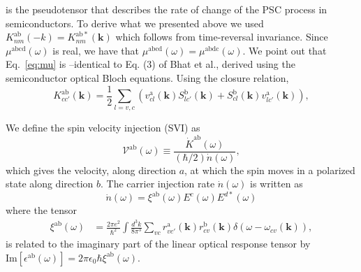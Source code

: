 \documentclass[floatfix,prb,aps,superscriptaddress,showpacs,11pt,preprint,letterpaper]{revtex4}
\begin{document}
is the pseudotensor that describes the rate of change of the  PSC process in
semiconductors. To derive what we presented above we used $
K^{\mathrm{ab}}_{nm}({\mathbf -k}) = K^{\mathrm{ab*}}_{nm}({\mathbf k})$ which
follows from time-reversal invariance. Since $\mu^{\mathrm{abcd}}(\omega)$ is
real, we have that $\mu^{\mathrm{abcd}}(\omega) =
\mu^{\mathrm{abdc}} (\omega)$. We point out that Eq.~\eqref{eq:mu} is
–identical to Eq. (3) of Bhat et al.\cite{bhatPRL05}, derived using the
semiconductor optical Bloch equations. Using the closure relation,
\begin{equation}
K^{\mathrm{ab}}_{cc'}({\mathbf k}) = \frac{1}{2}
\sum_{l=v,c}
\left(v^{\mathrm{a}}_{cl}({\mathbf k})S^{\mathrm{b}}_{lc'}({\mathbf k})
+S^{\mathrm{b}}_{cl}({\mathbf k}) v^{\mathrm{a}}_{lc'}({\mathbf k})
\right)
,
\label{eq:velspimatelem}
\end{equation}

We define the spin velocity injection (SVI) as
\begin{equation}\label{eq:vab-w}
\mathcal{V}^{\mathrm{ab}}(\omega) \equiv
\frac{\dot{K}^{\mathrm{ab}}(\omega)}{(\hbar/2) \dot{n}(\omega)},
\end{equation}  
which gives the velocity, along direction $a$, at which the spin moves in a
polarized state along direction $b$. The carrier injection rate $\dot
n(\omega)$ is written as\cite{nastosPRB05}
\begin{equation}
\dot{n}(\omega) =
\xi^{\mathrm{ab}}(\omega) E^{c }(\omega) E^{d*}(\omega)
\label{eq:dotn}
\end{equation}
where the tensor 
\begin{equation}\label{eq:xi}
\begin{aligned}
\xi^{\mathrm{ab}}(\omega)
&
=
\frac{2\pi e^{2}}{\hbar^{2}} \int 
\frac{d^{3}k}{8 \pi^{3}}
 \sum_{vc}
r^{\mathrm{a}}_{vc'}({\mathbf k})  
r^{\mathrm{b}}_{cv }({\mathbf k})  
\delta(\omega-\omega_{cv}({\mathbf k})), 
\end{aligned}
\end{equation}
is related to the imaginary part of the linear optical response tensor by
$\mathrm{Im} [\epsilon^{\mathrm{a}\mathrm{b}}(\omega)] =
2\pi\epsilon_0\hbar\xi^{\mathrm{a}\mathrm{b}}(\omega)$.
\end{document}
